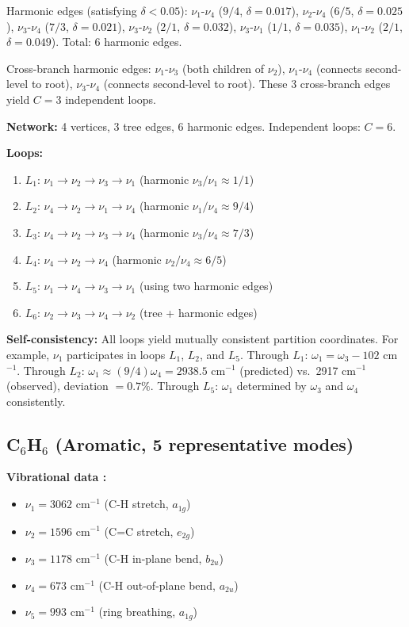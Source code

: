 \documentclass[11pt,a4paper]{article}
\theoremstyle{definition}
\theoremstyle{remark}
\begin{document}
Harmonic edges (satisfying $\delta < 0.05$): $\nu_1$-$\nu_4$ ($9/4$, $\delta = 0.017$), $\nu_2$-$\nu_4$ ($6/5$, $\delta = 0.025$), $\nu_3$-$\nu_4$ ($7/3$, $\delta = 0.021$), $\nu_3$-$\nu_2$ ($2/1$, $\delta = 0.032$), $\nu_3$-$\nu_1$ ($1/1$, $\delta = 0.035$), $\nu_1$-$\nu_2$ ($2/1$, $\delta = 0.049$). Total: 6 harmonic edges.

Cross-branch harmonic edges: $\nu_1$-$\nu_3$ (both children of $\nu_2$), $\nu_1$-$\nu_4$ (connects second-level to root), $\nu_3$-$\nu_4$ (connects second-level to root). These 3 cross-branch edges yield $C = 3$ independent loops.

\textbf{Network:} 4 vertices, 3 tree edges, 6 harmonic edges. Independent loops: $C = 6$.

\textbf{Loops:}
\begin{enumerate}[nosep]
\item $L_1$: $\nu_1 \to \nu_2 \to \nu_3 \to \nu_1$ (harmonic $\nu_3/\nu_1 \approx 1/1$)
\item $L_2$: $\nu_4 \to \nu_2 \to \nu_1 \to \nu_4$ (harmonic $\nu_1/\nu_4 \approx 9/4$)
\item $L_3$: $\nu_4 \to \nu_2 \to \nu_3 \to \nu_4$ (harmonic $\nu_3/\nu_4 \approx 7/3$)
\item $L_4$: $\nu_4 \to \nu_2 \to \nu_4$ (harmonic $\nu_2/\nu_4 \approx 6/5$)
\item $L_5$: $\nu_1 \to \nu_4 \to \nu_3 \to \nu_1$ (using two harmonic edges)
\item $L_6$: $\nu_2 \to \nu_3 \to \nu_4 \to \nu_2$ (tree + harmonic edges)
\end{enumerate}

\textbf{Self-consistency:} All loops yield mutually consistent partition coordinates. For example, $\nu_1$ participates in loops $L_1$, $L_2$, and $L_5$. Through $L_1$: $\omega_1 = \omega_3 - 102$ cm$^{-1}$. Through $L_2$: $\omega_1 \approx (9/4)\omega_4 = 2938.5$ cm$^{-1}$ (predicted) vs.\ 2917 cm$^{-1}$ (observed), deviation $= 0.7\%$. Through $L_5$: $\omega_1$ determined by $\omega_3$ and $\omega_4$ consistently.

\subsection{C$_6$H$_6$ (Aromatic, 5 representative modes)}

\textbf{Vibrational data \citep{shimanouchi1972, nist_webbook}:}
\begin{itemize}[nosep]
\item $\nu_1 = 3062$ cm$^{-1}$ (C-H stretch, $a_{1g}$)
\item $\nu_2 = 1596$ cm$^{-1}$ (C=C stretch, $e_{2g}$)
\item $\nu_3 = 1178$ cm$^{-1}$ (C-H in-plane bend, $b_{2u}$)
\item $\nu_4 = 673$ cm$^{-1}$ (C-H out-of-plane bend, $a_{2u}$)
\item $\nu_5 = 993$ cm$^{-1}$ (ring breathing, $a_{1g}$)
\end{itemize}
\end{document}
